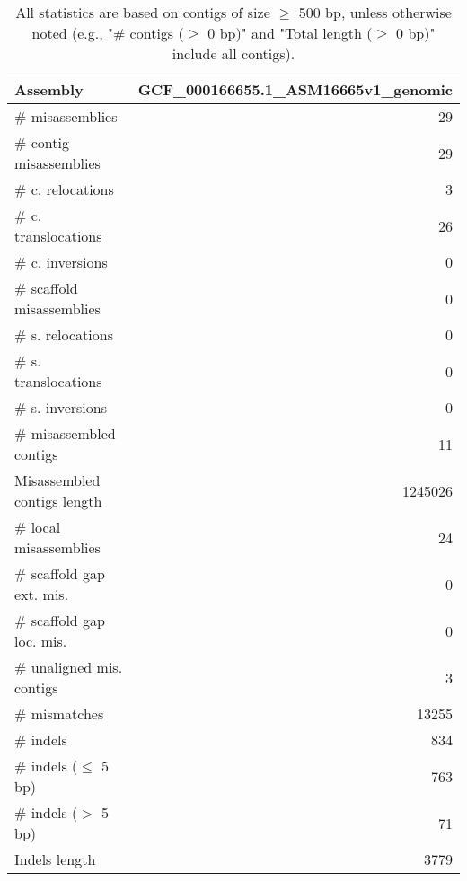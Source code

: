 \documentclass[12pt,a4paper]{article}
\begin{document}
\begin{table}[ht]
\begin{center}
\caption{All statistics are based on contigs of size $\geq$ 500 bp, unless otherwise noted (e.g., "\# contigs ($\geq$ 0 bp)" and "Total length ($\geq$ 0 bp)" include all contigs).}
\begin{tabular}{|l*{1}{|r}|}
\hline
Assembly & GCF\_000166655.1\_ASM16665v1\_genomic \\ \hline
\# misassemblies & 29 \\ \hline
\hspace{2mm}\# contig misassemblies & 29 \\ \hline
\hspace{5mm}\# c. relocations & 3 \\ \hline
\hspace{5mm}\# c. translocations & 26 \\ \hline
\hspace{5mm}\# c. inversions & 0 \\ \hline
\hspace{2mm}\# scaffold misassemblies & 0 \\ \hline
\hspace{5mm}\# s. relocations & 0 \\ \hline
\hspace{5mm}\# s. translocations & 0 \\ \hline
\hspace{5mm}\# s. inversions & 0 \\ \hline
\# misassembled contigs & 11 \\ \hline
Misassembled contigs length & 1245026 \\ \hline
\# local misassemblies & 24 \\ \hline
\# scaffold gap ext. mis. & 0 \\ \hline
\# scaffold gap loc. mis. & 0 \\ \hline
\# unaligned mis. contigs & 3 \\ \hline
\# mismatches & 13255 \\ \hline
\# indels & 834 \\ \hline
\hspace{5mm}\# indels ($\leq$ 5 bp) & 763 \\ \hline
\hspace{5mm}\# indels ($>$ 5 bp) & 71 \\ \hline
Indels length & 3779 \\ \hline
\end{tabular}
\end{center}
\end{table}
\end{document}
